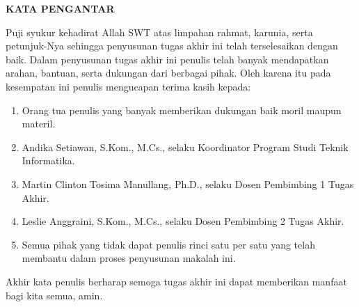 \clearpage
{}%
\thispagestyle{fancy}

\begin{justifying}
	\large \bfseries \centering \MakeUppercase{Kata Pengantar}
	
	\normalsize \normalfont \justifying
	Puji syukur kehadirat Allah SWT atas limpahan rahmat, karunia, serta petunjuk-Nya sehingga penyusunan tugas akhir ini telah terselesaikan dengan baik. Dalam penyusunan tugas akhir ini penulis telah banyak mendapatkan arahan, bantuan, serta dukungan dari berbagai pihak. Oleh karena itu pada kesempatan ini penulis mengucapan terima kasih kepada: \par
	\begin{enumerate}
		\item {Orang tua penulis yang banyak memberikan dukungan baik moril maupun materil.}
		\item {Andika Setiawan, S.Kom., M.Cs., selaku Koordinator Program Studi Teknik Informatika.}
		\item {Martin Clinton Tosima Manullang, Ph.D., selaku Dosen Pembimbing 1 Tugas Akhir.}
		\item {Leslie Anggraini, S.Kom., M.Cs., selaku Dosen Pembimbing 2 Tugas Akhir.}
		\item {Semua pihak yang tidak dapat penulis rinci satu per satu yang telah membantu dalam proses penyusunan makalah ini.}
	\end{enumerate} \par
	Akhir kata penulis berharap semoga tugas akhir ini dapat memberikan manfaat bagi kita semua, amin. 
	\vfill
	
\end{justifying}
\clearpage
